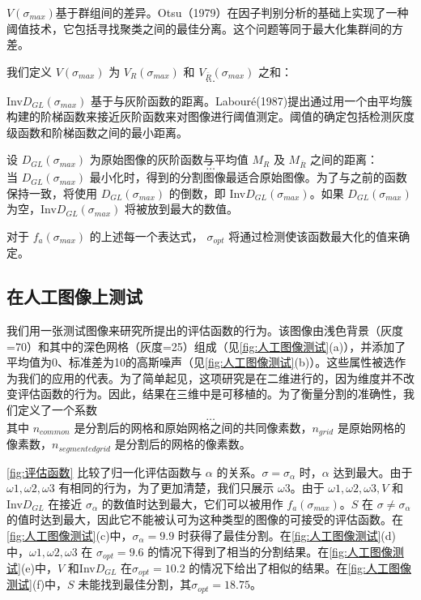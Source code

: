 $V(\sigma_{max})$基于群组间的差异。Otsu（1979）\cite{otsu1979threshold}在因子判别分析的基础上实现了一种阈值技术，它包括寻找聚类之间的最佳分离。这个问题等同于最大化集群间的方差。

我们定义 $V(\sigma_{max})$ 为 $V_{R}(\sigma_{max})$ 和 $V_{\overline{R}}(\sigma_{max})$ 之和：
\begin{equation}
    \dots
\end{equation}

Inv$D_{GL}(\sigma_{max})$ 基于与灰阶函数的距离。Labouré(1987)\cite{laboure1987feasibility}提出通过用一个由平均簇构建的阶梯函数来接近灰阶函数来对图像进行阈值测定。阈值的确定包括检测灰度级函数和阶梯函数之间的最小距离。

设 $D_{GL}(\sigma_{max})$ 为原始图像的灰阶函数与平均值 $M_R$ 及 $M_{\overline{R}}$ 之间的距离：
\begin{equation}
    \dots
\end{equation}
当 $D_{GL}(\sigma_{max})$ 最小化时，得到的分割图像最适合原始图像。为了与之前的函数保持一致，将使用 $D_{GL}(\sigma_{max})$ 的倒数，即 Inv$D_{GL}(\sigma_{max})$。如果 $D_{GL}(\sigma_{max})$ 为空，Inv$D_{GL}(\sigma_{max})$ 将被放到最大的数值。

对于 $f_{a}(\sigma_{max})$ 的上述每一个表达式， $\sigma_{opt}$ 将通过检测使该函数最大化的值来确定。

\subsection{在人工图像上测试}\label{sec:test}

我们用一张测试图像来研究所提出的评估函数的行为。该图像由浅色背景（灰度=70）和其中的深色网格（灰度=25）组成（见\cref{fig:人工图像测试}(a)），并添加了平均值为0、标准差为10的高斯噪声（见\cref{fig:人工图像测试}(b)）。这些属性被选作为我们的应用的代表。为了简单起见，这项研究是在二维进行的，因为维度并不改变评估函数的行为。因此，结果在三维中是可移植的。为了衡量分割的准确性，我们定义了一个系数
\begin{equation}
    \dots
\end{equation}
其中 $n_{common}$ 是分割后的网格和原始网格之间的共同像素数，$n_{grid}$ 是原始网格的像素数，$n_{segmented grid}$ 是分割后的网格的像素数。

\cref{fig:评估函数} 比较了归一化评估函数与 $\alpha$ 的关系。$\sigma = \sigma_{\alpha}$ 时，$\alpha$ 达到最大。由于 $\omega1,\omega2,\omega3$ 有相同的行为，为了更加清楚，我们只展示 $\omega3$。由于 $\omega1,\omega2,\omega3,V$ 和 Inv$D_{GL}$ 在接近 $\sigma_{\alpha}$ 的数值时达到最大，它们可以被用作 $f_{a}(\sigma_{max})$。$S$ 在 $\sigma \neq \sigma_{\alpha}$ 的值时达到最大，因此它不能被认可为这种类型的图像的可接受的评估函数。在\cref{fig:人工图像测试}(c)中，$\sigma_{\alpha} = 9.9$ 时获得了最佳分割。在\cref{fig:人工图像测试}(d)中，$\omega1,\omega2,\omega3$ 在 $\sigma_{opt} = 9.6$ 的情况下得到了相当的分割结果。在\cref{fig:人工图像测试}(e)中，$V$ 和Inv$D_{GL}$ 在$\sigma_{opt} = 10.2$ 的情况下给出了相似的结果。在\cref{fig:人工图像测试}(f)中，$S$ 未能找到最佳分割，其$\sigma_{opt} = 18.75$。

